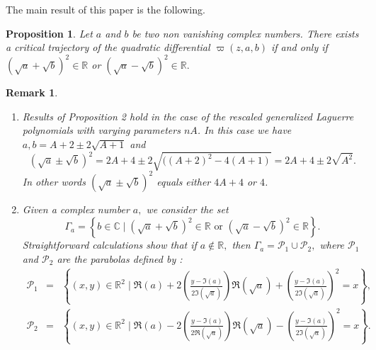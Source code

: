 \documentclass[12pt]{amsart}
\newtheorem{proposition}[theorem]{Proposition}
\newtheorem{remark}[theorem]{Remark}
\begin{document}
\bigskip

The main result of this paper is the following.

\begin{proposition}
\label{main} Let $a$ and $b$ be two non vanishing complex numbers. There
exists a critical trajectory of the quadratic differential $\varpi \left(
z,a,b\right)$ if and only if $\left( \sqrt{a}+\sqrt{b}\right) ^{2}\in 
\mathbb{R}
$ or $\left( \sqrt{a}-\sqrt{b}\right) ^{2}\in 
\mathbb{R}
.$
\end{proposition}

\begin{remark}
\begin{enumerate}
\item[(i)] Results of Proposition 2 hold in the case of the rescaled
generalized Laguerre polynomials with varying parameters $nA$. In this case
we have $a,b=A+2\pm 2\sqrt{A+1}$ and 
\begin{equation*}
\left( \sqrt{a}\pm \sqrt{b}\right) ^{2}=2A+4\pm 2\sqrt{((A+2)^{2}-4(A+1)}=2A+4\pm 2\sqrt{A^{2}}.
\end{equation*}In other words $\left( \sqrt{a}\pm \sqrt{b}\right) ^{2}$ equals either $4A+4$
or $4$.\newline

\item[(ii)] Given a complex number $a,$ we consider the set\begin{equation*}
\Gamma _{a}=\left\{ b\in 
\mathbb{C}
\mid \left( \sqrt{a}+\sqrt{b}\right) ^{2}\in 
\mathbb{R}
\text{ or }\left( \sqrt{a}-\sqrt{b}\right) ^{2}\in 
\mathbb{R}
\right\} .
\end{equation*}Straightforward calculations show that if $a\notin 
\mathbb{R}
,$ then $\Gamma _{a}=\mathcal{P}_{1}\cup \mathcal{P}_{2},$ where $\mathcal{P}_{1}$ and $\mathcal{P}_{2}$ are the parabolas defined by : 
\begin{eqnarray*}
\mathcal{P}_{1} & = &\left\{ (x,y) \in \mathbb{R}^{2}\mid \Re(a) +2\left( \frac{y-\Im\left( a\right) 
}{2\Im\left( \sqrt{a}\right) }\right) \Re\left( \sqrt{a}\right)
+\left( \frac{y-\Im\left( a\right) }{2\Im\left( \sqrt{a}\right) }
\right) ^{2}=x \right \} , \\
\mathcal{P}_{2} &=&\left\{ \left( x,y\right) \in \mathbb{R}^{2}\mid \Re\left( a\right) -2\left( \frac{y-\Im\left( a\right) 
}{2\Re\left( \sqrt{a}\right) }\right) \Re\left( \sqrt{a}\right)
-\left( \frac{y-\Im\left( a\right) }{2\Im\left( \sqrt{a}\right) }
\right) ^{2}=x\right\} .
\end{eqnarray*}
\end{enumerate}


\end{remark}
\end{document}
